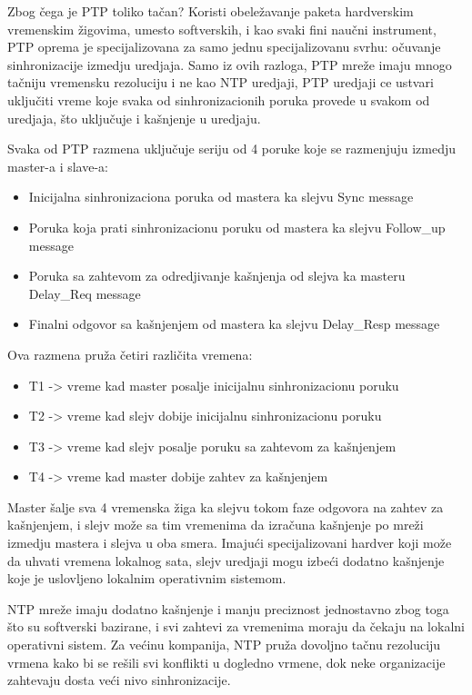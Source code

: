 \documentclass[a4paper,12pt, master]{etf}
\begin{document}
	Zbog \v{c}ega je PTP toliko ta\v{c}an? Koristi obele\v{z}avanje paketa
	hardverskim vremenskim \v{z}igovima, umesto softverskih, i kao svaki fini
	nau\v{c}ni instrument, PTP oprema je specijalizovana za samo jednu
	specijalizovanu svrhu: o\v{c}uvanje sinhronizacije izmedju uredjaja. Samo
	iz ovih razloga, PTP mre\v{z}e imaju mnogo ta\v{c}niju vremensku rezoluciju
	i ne kao NTP uredjaji, PTP uredjaji ce ustvari uklju\v{c}iti vreme koje
	svaka od sinhronizacionih poruka provede u svakom od uredjaja, \v{s}to
	uklju\v{c}uje i ka\v{s}njenje u uredjaju.

	Svaka od PTP razmena uklju\v{c}uje seriju od 4 poruke koje se razmenjuju
	izmedju master-a i slave-a:
	\begin{itemize}
		\item Inicijalna sinhronizaciona poruka od mastera ka slejvu {Sync
		message}
		\item Poruka koja prati sinhronizacionu poruku od mastera ka slejvu
		{Follow\_up message}
		\item Poruka sa zahtevom za odredjivanje ka\v{s}njenja od slejva ka
		masteru {Delay\_Req	message}
		\item Finalni odgovor sa ka\v{s}njenjem od mastera ka slejvu
		{Delay\_Resp message}
	\end{itemize}

	Ova razmena pru\v{z}a \v{c}etiri razli\v{c}ita vremena:
	\begin{itemize}
		\item T1 -> vreme kad master posalje inicijalnu sinhronizacionu poruku
		\item T2 -> vreme kad slejv dobije inicijalnu sinhronizacionu poruku
		\item T3 -> vreme kad slejv posalje poruku sa zahtevom za ka\v{s}njenjem
		\item T4 -> vreme kad master dobije zahtev za ka\v{s}njenjem
	\end{itemize}

	Master \v{s}alje sva 4 vremenska \v{z}iga ka slejvu tokom faze odgovora na
	zahtev za ka\v{s}njenjem, i slejv mo\v{z}e sa tim vremenima da izra\v{c}una
	ka\v{s}njenje po mre\v{z}i izmedju mastera i slejva u oba smera.
	Imaju\'{c}i specijalizovani hardver koji mo\v{z}e da uhvati vremena
	lokalnog sata, slejv uredjaji mogu izbe\'{c}i dodatno ka\v{s}njenje koje je
	uslovljeno lokalnim operativnim	sistemom.

	NTP mre\v{z}e imaju dodatno ka\v{s}njenje i manju preciznost jednostavno
	zbog toga \v{s}to su softverski bazirane, i svi zahtevi za vremenima moraju
	da \v{c}ekaju na lokalni operativni	sistem. Za ve\'{c}inu kompanija, NTP
	pru\v{z}a dovoljno ta\v{c}nu rezoluciju vrmena kako bi se re\v{s}ili
	svi konflikti u dogledno vrmene, dok neke organizacije zahtevaju dosta
	ve\'{c}i nivo sinhronizacije.
\end{document}
